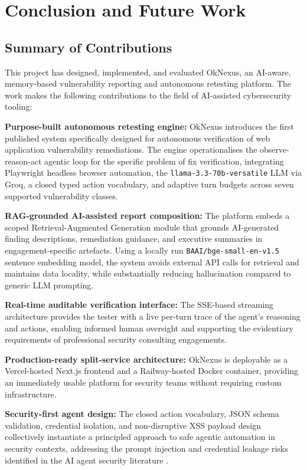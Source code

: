 \chapter{Conclusion and Future Work}

\section{Summary of Contributions}

This project has designed, implemented, and evaluated OkNexus, an AI-aware, memory-based vulnerability reporting and autonomous retesting platform. The work makes the following contributions to the field of AI-assisted cybersecurity tooling:

\textbf{Purpose-built autonomous retesting engine:} OkNexus introduces the first published system specifically designed for autonomous verification of web application vulnerability remediations. The engine operationalises the observe-reason-act agentic loop \cite{react2023} for the specific problem of fix verification, integrating Playwright headless browser automation, the \texttt{llama-3.3-70b-versatile} LLM via Groq, a closed typed action vocabulary, and adaptive turn budgets across seven supported vulnerability classes.

\textbf{RAG-grounded AI-assisted report composition:} The platform embeds a scoped Retrieval-Augmented Generation module that grounds AI-generated finding descriptions, remediation guidance, and executive summaries in engagement-specific artefacts. Using a locally run \texttt{BAAI/bge-small-en-v1.5} sentence embedding model, the system avoids external API calls for retrieval and maintains data locality, while substantially reducing hallucination compared to generic LLM prompting.

\textbf{Real-time auditable verification interface:} The SSE-based streaming architecture provides the tester with a live per-turn trace of the agent's reasoning and actions, enabling informed human oversight and supporting the evidentiary requirements of professional security consulting engagements.

\textbf{Production-ready split-service architecture:} OkNexus is deployable as a Vercel-hosted Next.js frontend and a Railway-hosted Docker container, providing an immediately usable platform for security teams without requiring custom infrastructure.

\textbf{Security-first agent design:} The closed action vocabulary, JSON schema validation, credential isolation, and non-disruptive XSS payload design collectively instantiate a principled approach to safe agentic automation in security contexts, addressing the prompt injection and credential leakage risks identified in the AI agent security literature \cite{ai_agents_under_threat2024, prompt_injection_review2025}.

